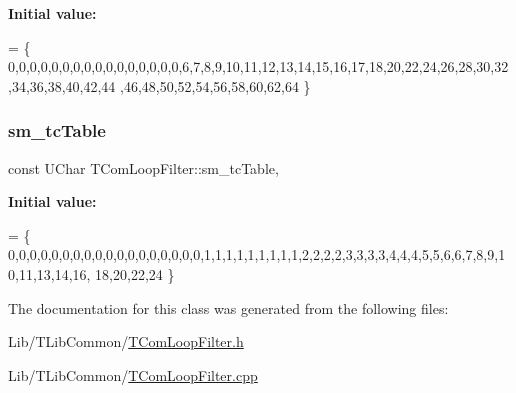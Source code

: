 {\bfseries Initial value\+:}
\begin{DoxyCode}
=
\{
  0,0,0,0,0,0,0,0,0,0,0,0,0,0,0,0,6,7,8,9,10,11,12,13,14,15,16,17,18,20,22,24,26,28,30,32,34,36,38,40,42,44
      ,46,48,50,52,54,56,58,60,62,64
\}
\end{DoxyCode}
\mbox{\label{class_t_com_loop_filter_a20f67069ab66d912792981c5b12f6262}} 
\subsubsection{\texorpdfstring{sm\+\_\+tc\+Table}{sm\_tcTable}}
{\footnotesize\ttfamily const U\+Char T\+Com\+Loop\+Filter\+::sm\+\_\+tc\+Table\hspace{0.3cm}{\ttfamily [static]}, {\ttfamily [protected]}}

{\bfseries Initial value\+:}
\begin{DoxyCode}
=
\{
  0,0,0,0,0,0,0,0,0,0,0,0,0,0,0,0,0,0,1,1,1,1,1,1,1,1,1,2,2,2,2,3,3,3,3,4,4,4,5,5,6,6,7,8,9,10,11,13,14,16,
      18,20,22,24
\}
\end{DoxyCode}


The documentation for this class was generated from the following files\+:\begin{DoxyCompactItemize}
\item 
Lib/\+T\+Lib\+Common/\hyperlink{_t_com_loop_filter_8h}{T\+Com\+Loop\+Filter.\+h}\item 
Lib/\+T\+Lib\+Common/\hyperlink{_t_com_loop_filter_8cpp}{T\+Com\+Loop\+Filter.\+cpp}\end{DoxyCompactItemize}
